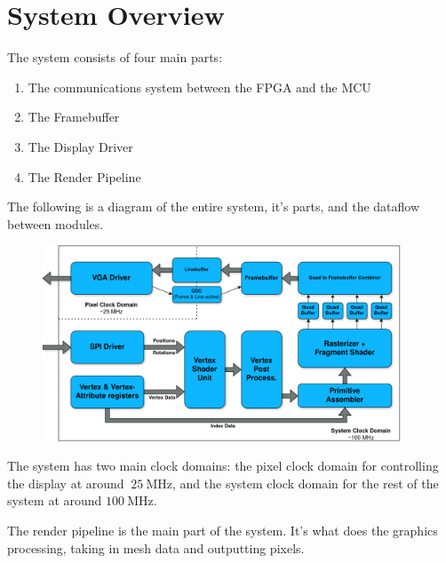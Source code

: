 \section{System Overview}

The system consists of four main parts:
\begin{enumerate}
    \item The communications system between the FPGA and the MCU
    \item The Framebuffer
    \item The Display Driver
    \item The Render Pipeline
\end{enumerate}

The following is a diagram of the entire system, it's parts, and the 
dataflow between modules.

\begin{figure}[H]
    \centering
    \includegraphics[width=0.95\textwidth]{Diagrams/fpga_system.png}
\end{figure}

The system has two main clock domains: the pixel clock domain for controlling the 
display at around $~\SI{25}{\mega\hertz}$, and the system clock domain for the rest 
of the system at around $\SI{100}{\mega\hertz}$.

The render pipeline is the main part of the system. It's what does the graphics 
processing, taking in mesh data and outputting pixels.
